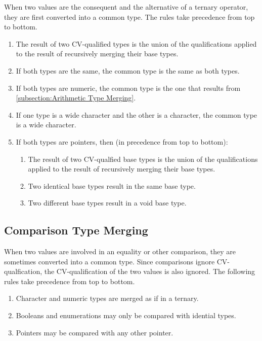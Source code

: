 \documentclass[letterpaper,12pt]{book}
\begin{document}
When two values are the consequent and the alternative of a ternary operator, they are first converted into a common type. The rules take precedence from top to bottom.

\begin{enumerate}
	\item The result of two CV-qualified types is the union of the qualifications applied to the result of recursively merging their base types.
	
	\item If both types are the same, the common type is the same as both types.
	
	\item If both types are numeric, the common type is the one that results from \ref{subsection:Arithmetic Type Merging}.
	
	\item If one type is a wide character and the other is a character, the common type is a wide character.
	
	\item If both types are pointers, then (in precedence from top to bottom):
	\begin{enumerate}
		\item The result of two CV-qualfied base types is the union of the qualifications applied to the result of recursively merging their base types.
		
		\item Two identical base types result in the same base type.
		
		\item Two different base types result in a void base type.
	\end{enumerate}
\end{enumerate}

\subsection{Comparison Type Merging}\label{subsection:Comparison Type Merging}

When two values are involved in an equality or other comparison, they are sometimes converted into a common type. Since comparisons ignore CV-qualfication, the CV-qualification of the two values is also ignored. The following rules take precedence from top to bottom.

\begin{enumerate}
	\item Character and numeric types are merged as if in a ternary.
	
	\item Booleans and enumerations may only be compared with idential types.
	
	\item Pointers may be compared with any other pointer.
\end{enumerate}
\end{document}
